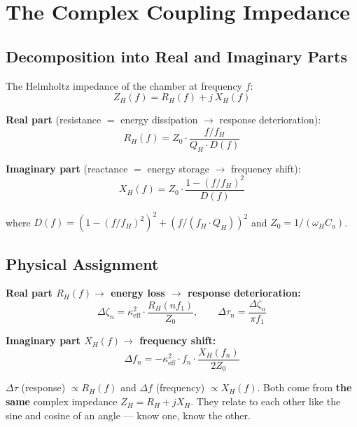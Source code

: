 \documentclass[11pt,a4paper]{article}
\begin{document}
\section{The Complex Coupling Impedance}

\subsection{Decomposition into Real and Imaginary Parts}

The Helmholtz impedance of the chamber at frequency $f$:
\begin{equation}
Z_H(f) = R_H(f) + j\,X_H(f)
\end{equation}

\textbf{Real part} (resistance $=$ energy dissipation $\to$ response deterioration):
\begin{equation}
R_H(f) = Z_0 \cdot \frac{f/f_H}{Q_H \cdot D(f)}
\end{equation}

\textbf{Imaginary part} (reactance $=$ energy storage $\to$ frequency shift):
\begin{equation}
X_H(f) = Z_0 \cdot \frac{1 - (f/f_H)^2}{D(f)}
\end{equation}

where $D(f) = \left(1 - (f/f_H)^2\right)^2 + \left(f/(f_H \cdot Q_H)\right)^2$ and $Z_0 = 1/(\omega_H C_a)$.

\subsection{Physical Assignment}

\textbf{Real part $R_H(f) \to$ energy loss $\to$ response deterioration:}
\begin{equation}
\Delta\zeta_n = \kappa_\text{eff}^2 \cdot \frac{R_H(nf_1)}{Z_0}, \qquad \Delta\tau_n = \frac{\Delta\zeta_n}{\pi f_1}
\end{equation}

\textbf{Imaginary part $X_H(f) \to$ frequency shift:}
\begin{equation}
\Delta f_n = -\kappa_\text{eff}^2 \cdot f_n \cdot \frac{X_H(f_n)}{2 Z_0}
\end{equation}

\begin{keybox}
$\Delta\tau$ (response) $\propto R_H(f)$ and $\Delta f$ (frequency) $\propto X_H(f)$. Both come from \textbf{the same} complex impedance $Z_H = R_H + jX_H$. They relate to each other like the sine and cosine of an angle --- know one, know the other.
\end{keybox}
\end{document}
